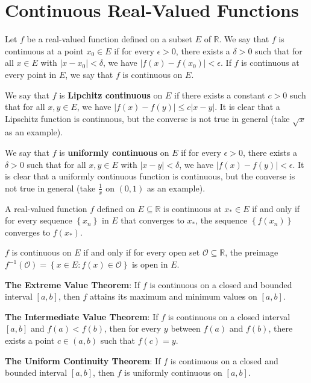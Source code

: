 \documentclass[../main.tex]{subfiles}
\begin{document}
\section{Continuous Real-Valued Functions}

Let $f$ be a real-valued function defined on a subset $E$ of $\mathbb{R}$. We say that $f$ is continuous at a point $x_0 \in E$ if for every $\epsilon > 0$, there exists a $\delta > 0$ such that for all $x \in E$ with $|x - x_0| < \delta$, we have $|f(x) - f(x_0)| < \epsilon$. If $f$ is continuous at every point in $E$, we say that $f$ is continuous on $E$.

We say that $f$ is \textbf{Lipchitz continuous} on $E$ if there exists a constant $c > 0$ such that for all $x,y \in E$, we have $|f(x) - f(y)| \leq c |x - y|$. It is clear that a Lipschitz function is continuous, but the converse is not true in general (take $\sqrt{x}$ as an example).

We say that $f$ is \textbf{uniformly continuous} on $E$ if for every $\epsilon > 0$, there exists a $\delta > 0$ such that for all $x,y \in E$ with $|x - y| < \delta$, we have $|f(x) - f(y)| < \epsilon$. It is clear that a uniformly continuous function is continuous, but the converse is not true in general (take $\frac{1}{x}$ on $(0,1)$ as an example).

\begin{proposition}{}{}
	A real-valued function $f$ defined on $E \subseteq \mathbb{R}$ is continuous at $x_* \in E$ if and only if for every sequence $\left\{ x_n \right\}$ in $E$ that converges to $x_*$, the sequence $\left\{ f(x_n) \right\}$ converges to $f(x_*)$.

	$f$ is continuous on $E$ if and only if for every open set $\mathcal{O} \subseteq \mathbb{R}$, the preimage $f^{-1}(\mathcal{O}) = \left\{ x \in E: f(x) \in \mathcal{O} \right\}$ is open in $E$.

	\textbf{The Extreme Value Theorem}: If $f$ is continuous on a closed and bounded interval $[a,b]$, then $f$ attains its maximum and minimum values on $[a,b]$.

	\textbf{The Intermediate Value Theorem}: If $f$ is continuous on a closed interval $[a,b]$ and $f(a) < f(b)$, then for every $y$ between $f(a)$ and $f(b)$, there exists a point $c \in (a,b)$ such that $f(c) = y$.

	\textbf{The Uniform Continuity Theorem}: If $f$ is continuous on a closed and bounded interval $[a,b]$, then $f$ is uniformly continuous on $[a,b]$.
\end{proposition}
\end{document}
